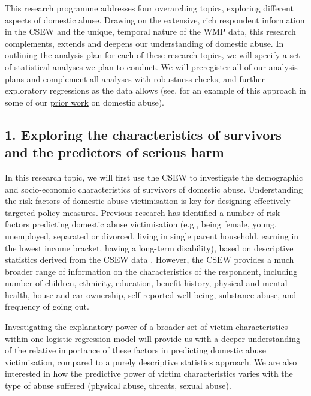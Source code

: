 \documentclass[11pt, a4paper]{article}
\newcommand{\NS}[1] {{\textcolor{green}{#1}}}
\begin{document}
This research programme addresses four overarching topics, exploring different aspects of domestic abuse. Drawing on the extensive, rich respondent information in the CSEW and the unique, temporal nature of the WMP data, this research complements, extends and deepens our understanding of domestic abuse. In outlining the analysis plan for each of these research topics, we will specify a set of statistical analyses we plan to conduct. We will preregister all of our analysis plans and complement all analyses with robustness checks, and further exploratory regressions as the data allows (see, for an example of this approach in some of our \href{https://cog.warwick.ac.uk/~pssmar/Trendl_Stewart_Mullett.pdf}{prior work} on domestic abuse).

\subsection*{1. Exploring the characteristics of survivors and the predictors of serious harm}


In this research topic, we will first use the CSEW to investigate the demographic and socio-economic characteristics of survivors of domestic abuse. Understanding the risk factors of domestic abuse victimisation is key for designing effectively targeted policy measures. Previous research has identified a number of risk factors predicting domestic abuse victimisation (e.g., being female, young, unemployed, separated or divorced, living in single parent household, earning in the lowest income bracket, having a long-term disability), based on descriptive statistics derived from the CSEW data \cite{ONS}. However, the CSEW provides a much broader range of information on the characteristics of the respondent, including number of children, ethnicity, education, benefit history, physical and mental health, house and car ownership, self-reported well-being, substance abuse, and frequency of going out. 

Investigating the explanatory power of a broader set of victim characteristics within one logistic regression model will provide us with a deeper understanding of the relative importance of these factors in predicting domestic abuse victimisation, compared to a purely descriptive statistics approach. We are also interested in how the predictive power of victim characteristics varies with the type of abuse suffered (physical abuse, threats, sexual abuse).
\end{document}
